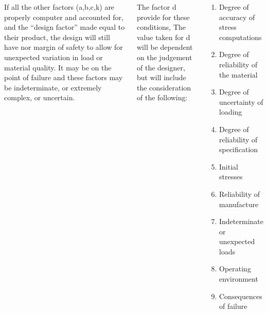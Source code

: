 \documentclass[20pt, a0paper, portrait]{tikzposter}
\begin{document}
\begin{columns}
{      If all the other factors (a,b,c,k) are properly computer and accounted for, and the ``design factor'' made equal to their product, the design will still have nor margin of safety to allow for unexpected variation in load or material quality. It may be on the point of failure and these factors may be indeterminate, or extremely complex, or uncertain.

      The factor d provide for these conditions, The value taken for d will be dependent on the judgement of the designer, but will include the consideration of the following:

      \begin{multicols}{2}
      \begin{enumerate}
        \itemsep0em
        \item Degree of accuracy of stress computations %
        \item Degree of reliability of the material %
        \item Degree of uncertainty of loading %
        \item Degree of reliability of specification %
        \item Initial stresses %
        \item Reliability of manufacture %
        \item Indeterminate or unexpected loads %
        \item Operating environment %
        \item Consequences of failure %
      \end{enumerate}
      \end{multicols}

}
\end{columns}
\end{document}
